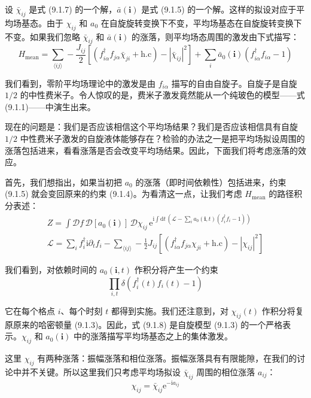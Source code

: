 设 $\bar{\chi}_{ij}$ 是式 (9.1.7) 的一个解，$\bar{a}(\pmb{i})$ 是式 (9.1.5) 的一个解。这样的拟设对应于平均场基态。由于 $\chi_{ij}$ 和 $a_0$ 在自旋旋转变换下不变，平均场基态在自旋旋转变换下不变。如果我们忽略 $\bar{\chi}_{ij}$ 和 $\bar{a}(\pmb{i})$ 的涨落，则平均场态周围的激发由下式描写：
\begin{equation*}
H_{\text{mean}}=\sum_{\langle ij\rangle}-\frac{J_{ij}}{2}\left[\left(f^{\dagger}_{i\alpha}f_{j\alpha}\bar{\chi}_{ji}+\text{h.c}\right)-|\bar{\chi}_{ij}|^{2}\right]+\sum_{i}\bar{a}_0(\pmb{i})\left(f^{\dagger}_{i\alpha}f_{i\alpha}-1\right)
\end{equation*}

我们看到，零阶平均场理论中的激发是由 $f_{i\alpha}$ 描写的自由自旋子。自旋子是自旋 $1/2$ 的中性费米子。令人惊叹的是，费米子激发竟然能从一个纯玻色的模型——式 (9.1.1)——中演生出来。

现在的问题是：我们是否应该相信这个平均场结果？我们是否应该相信具有自旋 $1/2$ 中性费米子激发的自旋液体能够存在？检验的办法之一是把平均场拟设周围的涨落包括进来，看看涨落是否会改变平均场结果。因此，下面我们将考虑涨落的效应。

首先，我们想指出，如果当初把 $a_0$ 的涨落（即时间依赖性）包括进来，约束 (9.1.5) 就会变回原来的约束 (9.1.4)。为看清这一点，让我们考虑 $H_{\text{mean}}$ 的路径积分表述：
\begin{gather*}
Z=\int\mathcal{D}f\,\mathcal{D}[a_0(\pmb{i})]\,\mathcal{D}\chi_{ij}\,\mathrm{e}^{\mathrm{i}\int\mathrm{d}t\,(\mathcal{L}-\sum_{i}a_0(\pmb{i},t)(f^{\dagger}_if_i-1))}\\
\mathcal{L}=\sum_{i}f^{\dagger}_i\mathrm{i}\partial_tf_i-\sum_{\langle ij\rangle}-\frac{1}{2}J_{ij}\left[\left(f^{\dagger}_{i\alpha}f_{j\alpha}\chi_{ji}+\text{h.c}\right)-|\chi_{ij}|^{2}\right]
\tag{9.1.8}
\end{gather*}

我们看到，对依赖时间的 $a_0(\pmb{i},t)$ 作积分将产生一个约束
\begin{equation*}
\prod_{i,t}\delta\left(f^{\dagger}_i(t)f_i(t)-1\right)
\end{equation*}

它在每个格点 $i$、每个时刻 $t$ 都得到实施。我们还注意到，对 $\chi_{ij}(t)$ 作积分将复原原来的哈密顿量 (9.1.3)。因此，式 (9.1.8) 是自旋模型 (9.1.3) 的一个严格表示。$\chi_{ij}$ 和 $a_0(\pmb{i})$ 中的涨落描写平均场基态之上的集体激发。

这里 $\chi_{ij}$ 有两种涨落：振幅涨落和相位涨落。振幅涨落具有有限能隙，在我们的讨论中并不关键。所以这里我们只考虑平均场拟设 $\bar{\chi}_{ij}$ 周围的相位涨落 $a_{ij}$：
\begin{equation*}
\chi_{ij}=\bar{\chi}_{ij}\mathrm{e}^{-\mathrm{i}a_{ij}}
\tag{9.1.9}
\end{equation*}

